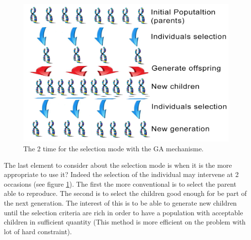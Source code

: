 \begin{figure}[t!]
   \includegraphics[width=\linewidth]{img/GA2selections.png}
  \caption{The 2  time for  the selection mode with the GA  mechanisme.}\label{fig:GA2selections}
  \endminipage\hfill
\end{figure}
The last element to consider about the selection mode is when it is the more appropriate to use it? 
Indeed  the selection of the individual may intervene at 2 occasions (see figure \ref{fig:GA2selections}).  The first  the more conventional is  to select the parent  able to reproduce. The second is to select the children good enough for be part of the next generation. The interest of this is to be able to generate new children until the selection criteria are rich in order to have a population with acceptable children in sufficient quantity (This method is more efficient on the problem with lot of hard constraint). 


 

%
%			 

%
%
	


